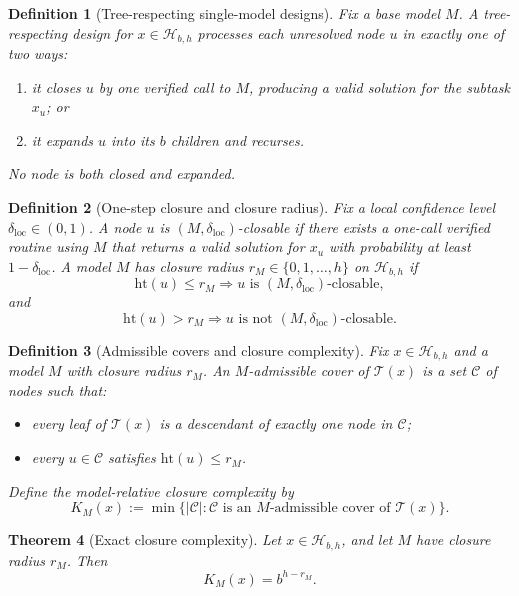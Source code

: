 \documentclass[10pt]{article}
\theoremstyle{paperplain}
\newtheorem{theorem}{Theorem}[section]
\theoremstyle{paperdefinition}
\newtheorem{definition}[theorem]{Definition}
\theoremstyle{paperremark}
\begin{document}
\begin{definition}[Tree-respecting single-model designs]
\label{def:tree-respecting}
Fix a base model $M$.
A tree-respecting design for $x\in\mathcal H_{b,h}$ processes each unresolved node $u$ in exactly one of two ways:
\begin{enumerate}
\item it closes $u$ by one verified call to $M$, producing a valid solution for the subtask $x_u$; or
\item it expands $u$ into its $b$ children and recurses.
\end{enumerate}
No node is both closed and expanded.
\end{definition}

\begin{definition}[One-step closure and closure radius]
\label{def:closure-radius}
Fix a local confidence level $\delta_{\mathrm{loc}}\in(0,1)$.
A node $u$ is $(M,\delta_{\mathrm{loc}})$-closable if there exists a one-call verified routine using $M$ that returns a valid solution for $x_u$ with probability at least $1-\delta_{\mathrm{loc}}$.
A model $M$ has closure radius $r_M\in\{0,1,\dots,h\}$ on $\mathcal H_{b,h}$ if
\[
\mathrm{ht}(u)\le r_M \Longrightarrow u \text{ is } (M,\delta_{\mathrm{loc}})\text{-closable},
\]
and
\[
\mathrm{ht}(u)> r_M \Longrightarrow u \text{ is not } (M,\delta_{\mathrm{loc}})\text{-closable}.
\]
\end{definition}

\begin{definition}[Admissible covers and closure complexity]
\label{def:closure-complexity}
Fix $x\in\mathcal H_{b,h}$ and a model $M$ with closure radius $r_M$.
An $M$-admissible cover of $\mathcal T(x)$ is a set $\mathcal C$ of nodes such that:
\begin{itemize}
\item every leaf of $\mathcal T(x)$ is a descendant of exactly one node in $\mathcal C$;
\item every $u\in\mathcal C$ satisfies $\mathrm{ht}(u)\le r_M$.
\end{itemize}
Define the model-relative closure complexity by
\[
K_M(x):=\min\{|\mathcal C|:\mathcal C \text{ is an } M\text{-admissible cover of } \mathcal T(x)\}.
\]
\end{definition}

\begin{theorem}[Exact closure complexity]
\label{thm:closure-complexity}
Let $x\in\mathcal H_{b,h}$, and let $M$ have closure radius $r_M$.
Then
\[
K_M(x)=b^{h-r_M}.
\]
\end{theorem}
\end{document}

